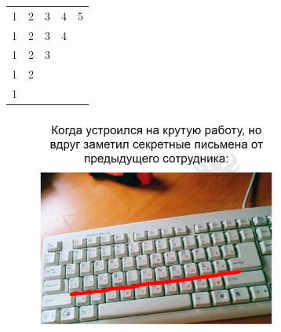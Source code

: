 \documentclass{article}
\begin{document}
\begin{tabular}{ |c|c|c|c|c| }
\hline
1 & 2 & 3 & 4 & 5 \\ 
1 & 2 & 3 & 4 &   \\ 
1 & 2 & 3 &   &   \\ 
1 & 2 &   &   &   \\ 
1 &   &   &   &   \\ 
\hline
\end{tabular}
\begin{figure}
\includegraphics[width=8cm]{ image.png }\end{figure}
\end{document}
